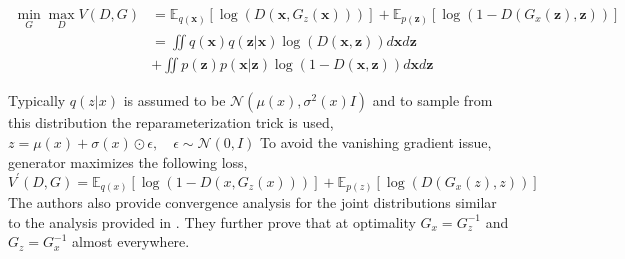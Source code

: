 \begin{equation}
\begin{aligned} \min _{G} \max _{D} V(D, G) &=\mathbb{E}_{q(\boldsymbol{x})}\left[\log \left(D\left(\boldsymbol{x}, G_{z}(\boldsymbol{x})\right)\right)\right]+\mathbb{E}_{p(\boldsymbol{z})}\left[\log \left(1-D\left(G_{x}(\boldsymbol{z}), \boldsymbol{z}\right)\right)\right] \\ &=\iint q(\boldsymbol{x}) q(\boldsymbol{z} | \boldsymbol{x}) \log (D(\boldsymbol{x}, \boldsymbol{z})) d \boldsymbol{x} d \boldsymbol{z} \\ &+\iint p(\boldsymbol{z}) p(\boldsymbol{x} | \boldsymbol{z}) \log (1-D(\boldsymbol{x}, \boldsymbol{z})) d \boldsymbol{x} d \boldsymbol{z} \end{aligned}
\end{equation}

Typically $q(z|x)$ is assumed to be $\mathcal{N}(\mu(x), \sigma^2(x)I)$ and to sample from this distribution the reparameterization trick \citep{kingma2014} is used,
$z=\mu(x)+\sigma(x) \odot \epsilon, \quad \epsilon \sim \mathcal{N}(0, I)$
 To avoid the vanishing gradient issue, generator maximizes the following loss,
 $$
V^{\prime}(D, G)=\mathbb{E}_{q(x)}\left[\log \left(1-D\left(x, G_{z}(x)\right)\right)\right]+\mathbb{E}_{p(z)}\left[\log \left(D\left(G_{x}(z), z\right)\right)\right]
$$
The authors also provide convergence analysis for the joint distributions similar to the analysis provided in \cite{ganGoodfellow}. They further prove that at optimality $G_x = G_z^{-1}$ and $G_z = G_x^{-1}$ almost everywhere.






